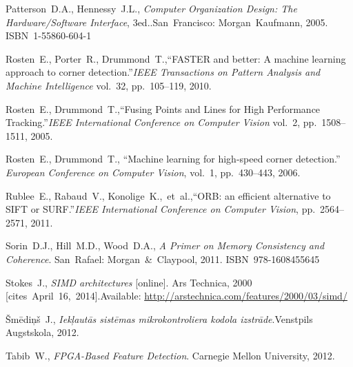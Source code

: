 {\begin{thebibliography}{99}
			Patterson~D.A., Hennessy~J.L., \linebreak[1]
			\textit{Computer Organization Design: %
				The Hardware/Software Interface}, 3\rd ed..\linebreak[1]
			San~Francisco: Morgan~Kaufmann, 2005. ISBN~1-55860-604-1
		
			Rosten~E., Porter~R., Drummond~T.,\linebreak[1]
			``FASTER and better: A machine learning approach to corner detection.''\linebreak[1]
			\textit{IEEE Transactions on Pattern Analysis and Machine Intelligence} vol.~32,
			pp.~105--119, 2010.
		
			Rosten~E., Drummond~T.,\linebreak[1]
			``Fusing Points and Lines for High Performance Tracking.''\linebreak[1]
			\textit{IEEE International Conference on Computer Vision} vol.~2,
			pp.~1508--1511, 2005.
		
			Rosten~E., Drummond~T.,
			``Machine learning for high-speed corner detection.''
			\textit{European Conference on Computer Vision}, vol.~1, pp.~430--443,
			2006.
		
			Rublee~E., Rabaud~V., Konolige~K.,~et~al.,\linebreak[1]
			``ORB: an efficient alternative to SIFT or SURF.''\linebreak[1]
			\textit{IEEE International Conference on Computer Vision},
			pp.~2564--2571, 2011.
		
			Sorin~D.J., Hill~M.D., Wood~D.A.,
			\textit{A Primer on Memory Consistency and Coherence}.
			San~Rafael: Morgan~\&~Claypool, 2011. ISBN~978-1608455645
		
			Stokes~J.,
			\textit{SIMD architectures} [online]. Ars Technica, 2000 %
			[cites~April~16,~2014].\linebreak[1]
			Available: \url{http://arstechnica.com/features/2000/03/simd/}
		
			Šmēdiņš~J.,
			\textit{Iekļautās sistēmas mikrokontroliera kodola izstrāde}.\linebreak[1]
			Venstpils Augstskola, 2012.
		
			Tabib~W.,
			\textit{FPGA-Based Feature Detection}.
			Carnegie Mellon University, 2012.
		

\end{thebibliography}}
